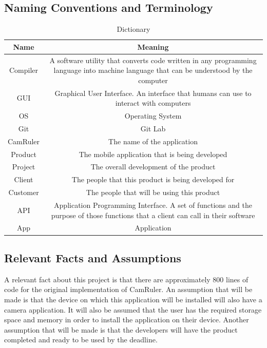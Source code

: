 \documentclass[12pt, titlepage]{article}
\begin{document}
\subsection{Naming Conventions and Terminology}
\begin{table}[H]
\begin{center}
\begin{tabular}{|c|S|}
\hline
\hline
Name & Meaning\\
\hline
Compiler & A software utility that converts code written in any programming language into machine language that can be understood by the computer\\
\hline
GUI & Graphical User Interface. An interface that humans can use to interact with computers\\
\hline
OS & Operating System\\
\hline
Git & Git Lab\\
\hline
CamRuler & The name of the application\\
\hline
Product & The mobile application that is being developed\\
\hline
Project & The overall development of the product\\
\hline
Client & The people that this product is being developed for\\
\hline
Customer &  The people that will be using this product\\
\hline
API & Application Programming Interface. A set of functions and the purpose of those functions that a client can call in their software\\
\hline
App & Application\\
\hline
\hline
\end{tabular}
\caption{Dictionary}
\end{center}
\label{table:1}
\end{table}

\subsection{Relevant Facts and Assumptions}

A relevant fact about this project is that there are approximately 800 lines of code for the original implementation of CamRuler. An assumption that will be made is that the device on which this application will be installed will also have a camera application. It will also be assumed that the user has the required storage space and memory in order to install the application on their device. Another assumption that will be made is that the developers will have the product completed and ready to be used by the deadline.
\end{document}
